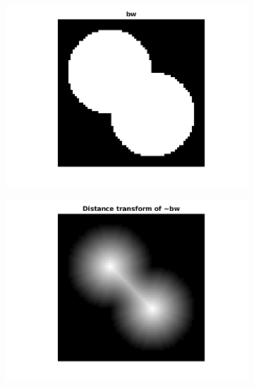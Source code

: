 \begin{figure}[htbp]
    \centering
    \begin{subfigure}[b]{0.5\textwidth}
        \includegraphics[width=\textwidth]{img/circlesEx.png}
        \caption{ }
        \label{fig:overlap}
    \end{subfigure}
     \quad
    \begin{subfigure}[b]{0.5\textwidth}
        \includegraphics[width=\textwidth]{img/distancerTransform.png}
        \caption{ }
        \label{fig:overlaptransf}
    \end{subfigure}
    \quad
    \begin{subfigure}[b]{0.5\textwidth}

\end{subfigure}
\end{figure}
